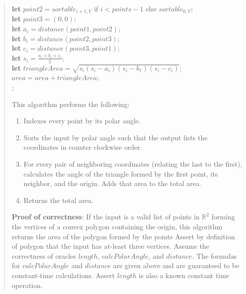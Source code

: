 \documentclass[11pt]{article}
\begin{document}
\begin{enumerate}
\begin{enumerate}
\begin{quote}
\begin{algorithm}[H]
{{                    \textbf{let} $point2 = sortable_{i + 1, V}$ if $i < points - 1$ else $sortable_{0, V}$; \\
                    \textbf{let} $point3 = (0, 0)$; \\
                    \textbf{let} $a_i = distance(point1, point2)$; \\
                    \textbf{let} $b_i = distance(point2, point3)$; \\
                    \textbf{let} $c_i = distance(point3, point1)$; \\
                    \textbf{let} $s_i = \frac{a_i + b_i + c_i}{2}$; \\
                    \textbf{let} $triangleArea = \sqrt{s_i(s_i - a_i)(s_i - b_1)(s_i - c_i)}$; \\
                    $area = area + triangleArea$; \\
                }
                ;
                }
            \end{algorithm} 
            \vspace{1em} 
            This algorithm performs the following:
            \begin{enumerate}
                \item Indexes every point by its polar angle.
                \item Sorts the input by polar angle such that the output lists the coordinates in counter clockwise order.
                \item For every pair of neighboring coordinates (relating the last to the first), calculates the angle of the triangle formed by the first point, its neighbor, and the origin. Adds that area to the total area.
                \item Returns the total area.
            \end{enumerate}
            \vspace{1em} 
            \textbf{Proof of correctness}: \newline
            If the input is a valid list of points in $\mathbb{R}^2$ forming the vertices of a convex polygon containing the origin, this algorithm returns the area of the polygon formed by the points \newline 
            Assert by definition of polygon that the input has at-least three vertices. \newline 
            Assume the correctness of oracles $length$, $calcPolarAngle$, and $distance$. The formulas for $calcPolarAngle$ and $distance$ are given above and are guaranteed to be constant-time calculations. Assert $length$ is also a known constant time operation. \newline 

\end{quote}
\end{enumerate}
\end{enumerate}
\end{document}
